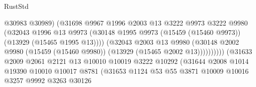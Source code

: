 \begin{lexlean}{RustStd}
\begin{coremodule}
                                          @30983
                                          @30989)
                                        (@31698
                                          @9967
                                          @1996
                                          @2003
                                          @13
                                          @3222
                                          @9973
                                          @3222
                                          @9980
                                          (@32043
                                            @1996
                                            @13
                                            @9973
                                            (@30148
                                              @1995
                                              @9973
                                              (@15459 (@15460 @9973))
                                              (@13929 (@15465 @1995 @13))))
                                          (@32043
                                            @2003
                                            @13
                                            @9980
                                            (@30148
                                              @2002
                                              @9980
                                              (@15459 (@15460 @9980))
                                              (@13929 (@15465 @2002 @13))))))))))
                              (@31633
                                @2009
                                @2061
                                @2121
                                @13
                                @10010
                                @10019
                                @3222
                                @10292
                                (@31644
                                  @2008
                                  @1014
                                  @19390
                                  @10010
                                  @10017
                                  @8781
                                  (@31653
                                    @1124
                                    @53
                                    @55
                                    @3871
                                    @10009
                                    @10016
                                    @3257
                                    @9992
                                    @3263
                                    @30126

\end{coremodule}
\end{lexlean}
